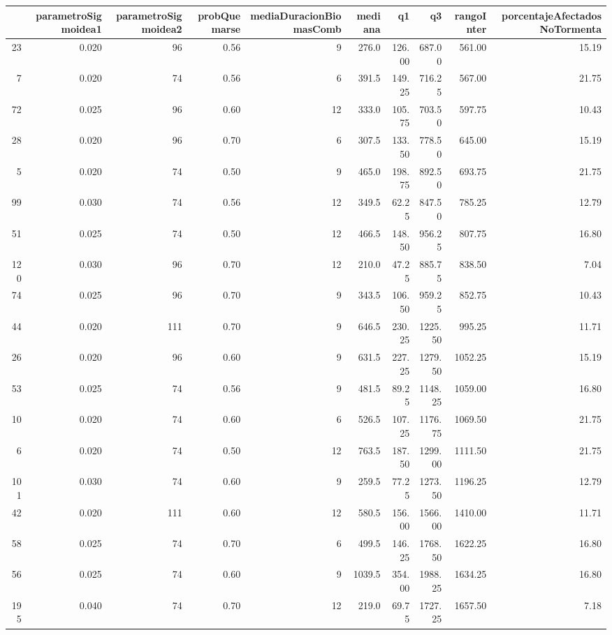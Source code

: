 \begin{table}[ht]
\centering
\begin{tabular}{rrrrrrrrrr}
  \hline
 & parametroSigmoidea1 & parametroSigmoidea2 & probQuemarse & mediaDuracionBiomasComb & mediana & q1 & q3 & rangoInter & porcentajeAfectadosNoTormenta \\ 
  \hline
23 & 0.020 & 96 & 0.56 & 9 & 276.0 & 126.00 & 687.00 & 561.00 & 15.19 \\ 
  7 & 0.020 & 74 & 0.56 & 6 & 391.5 & 149.25 & 716.25 & 567.00 & 21.75 \\ 
  72 & 0.025 & 96 & 0.60 & 12 & 333.0 & 105.75 & 703.50 & 597.75 & 10.43 \\ 
  28 & 0.020 & 96 & 0.70 & 6 & 307.5 & 133.50 & 778.50 & 645.00 & 15.19 \\ 
  5 & 0.020 & 74 & 0.50 & 9 & 465.0 & 198.75 & 892.50 & 693.75 & 21.75 \\ 
  99 & 0.030 & 74 & 0.56 & 12 & 349.5 & 62.25 & 847.50 & 785.25 & 12.79 \\ 
  51 & 0.025 & 74 & 0.50 & 12 & 466.5 & 148.50 & 956.25 & 807.75 & 16.80 \\ 
  120 & 0.030 & 96 & 0.70 & 12 & 210.0 & 47.25 & 885.75 & 838.50 & 7.04 \\ 
  74 & 0.025 & 96 & 0.70 & 9 & 343.5 & 106.50 & 959.25 & 852.75 & 10.43 \\ 
  44 & 0.020 & 111 & 0.70 & 9 & 646.5 & 230.25 & 1225.50 & 995.25 & 11.71 \\ 
  26 & 0.020 & 96 & 0.60 & 9 & 631.5 & 227.25 & 1279.50 & 1052.25 & 15.19 \\ 
  53 & 0.025 & 74 & 0.56 & 9 & 481.5 & 89.25 & 1148.25 & 1059.00 & 16.80 \\ 
  10 & 0.020 & 74 & 0.60 & 6 & 526.5 & 107.25 & 1176.75 & 1069.50 & 21.75 \\ 
  6 & 0.020 & 74 & 0.50 & 12 & 763.5 & 187.50 & 1299.00 & 1111.50 & 21.75 \\ 
  101 & 0.030 & 74 & 0.60 & 9 & 259.5 & 77.25 & 1273.50 & 1196.25 & 12.79 \\ 
  42 & 0.020 & 111 & 0.60 & 12 & 580.5 & 156.00 & 1566.00 & 1410.00 & 11.71 \\ 
  58 & 0.025 & 74 & 0.70 & 6 & 499.5 & 146.25 & 1768.50 & 1622.25 & 16.80 \\ 
  56 & 0.025 & 74 & 0.60 & 9 & 1039.5 & 354.00 & 1988.25 & 1634.25 & 16.80 \\ 
  195 & 0.040 & 74 & 0.70 & 12 & 219.0 & 69.75 & 1727.25 & 1657.50 & 7.18 \\ 

\end{tabular}
\end{table}
